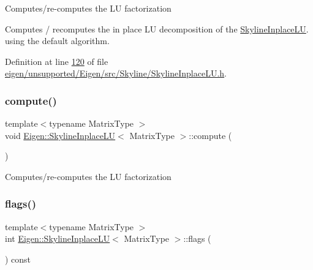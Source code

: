 Computes/re-\/computes the LU factorization

Computes / recomputes the in place LU decomposition of the \hyperlink{class_eigen_1_1_skyline_inplace_l_u}{Skyline\+Inplace\+LU}. using the default algorithm. 

Definition at line \hyperlink{eigen_2unsupported_2_eigen_2src_2_skyline_2_skyline_inplace_l_u_8h_source_l00120}{120} of file \hyperlink{eigen_2unsupported_2_eigen_2src_2_skyline_2_skyline_inplace_l_u_8h_source}{eigen/unsupported/\+Eigen/src/\+Skyline/\+Skyline\+Inplace\+L\+U.\+h}.

\mbox{\label{class_eigen_1_1_skyline_inplace_l_u_a590e9a988b2843712a29a541787e6c38}} 
\subsubsection{\texorpdfstring{compute()}{compute()}\hspace{0.1cm}{\footnotesize\ttfamily [2/2]}}
{\footnotesize\ttfamily template$<$typename Matrix\+Type $>$ \\
void \hyperlink{class_eigen_1_1_skyline_inplace_l_u}{Eigen\+::\+Skyline\+Inplace\+LU}$<$ Matrix\+Type $>$\+::compute (\begin{DoxyParamCaption}{ }\end{DoxyParamCaption})}

Computes/re-\/computes the LU factorization \mbox{\label{class_eigen_1_1_skyline_inplace_l_u_a5e491f7643c548ac81d3f4a7e432be19}} 
\subsubsection{\texorpdfstring{flags()}{flags()}\hspace{0.1cm}{\footnotesize\ttfamily [1/2]}}
{\footnotesize\ttfamily template$<$typename Matrix\+Type $>$ \\
int \hyperlink{class_eigen_1_1_skyline_inplace_l_u}{Eigen\+::\+Skyline\+Inplace\+LU}$<$ Matrix\+Type $>$\+::flags (\begin{DoxyParamCaption}{ }\end{DoxyParamCaption}) const\hspace{0.3cm}{\ttfamily [inline]}}

